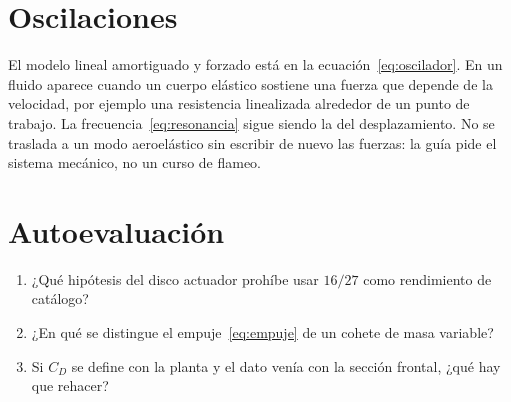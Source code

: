 \section{Oscilaciones}

El modelo lineal amortiguado y forzado está en la ecuación~\eqref{eq:oscilador}. En un fluido aparece cuando un cuerpo elástico sostiene una fuerza que depende de la velocidad, por ejemplo una resistencia linealizada alrededor de un punto de trabajo. La frecuencia~\eqref{eq:resonancia} sigue siendo la del desplazamiento. No se traslada a un modo aeroelástico sin escribir de nuevo las fuerzas: la guía pide el sistema mecánico, no un curso de flameo.

\section{Autoevaluación}
\begin{enumerate}[leftmargin=1.4em]
\item ¿Qué hipótesis del disco actuador prohíbe usar \(16/27\) como rendimiento de catálogo?
\item ¿En qué se distingue el empuje~\eqref{eq:empuje} de un cohete de masa variable?
\item Si \(C_D\) se define con la planta y el dato venía con la sección frontal, ¿qué hay que rehacer?
\end{enumerate}

